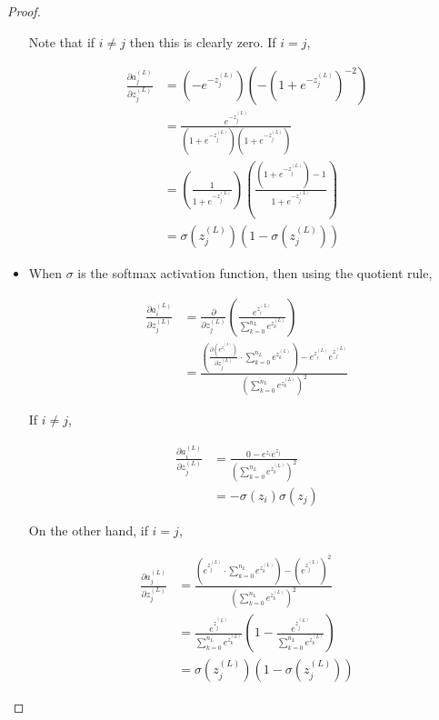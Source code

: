 \documentclass{article}
\begin{document}
\begin{proof}
\begin{itemize}
                Note that if $i \neq j$ then this is clearly zero. If $i = j$,
                
                $$ \begin{aligned}
                \frac{\partial a^{(L)}_j}{\partial z^{(L)}_j}
                &= \left( - e^{-z^{(L)}_j} \right) \left( - \left( 1 + e^{-z^{(L)}_j} \right)^{-2} \right) \\
                &= \frac{e^{-z^{(L)}_j}}{\left( 1 + e^{-z^{(L)}_j} \right) \left( 1 + e^{-z^{(L)}_j} \right)} \\
                &= \left( \frac{1}{1 + e^{-z^{(L)}_j}} \right) \left( \frac{\left( 1 + e^{-z^{(L)}_j} \right) - 1}{1 + e^{-z^{(L)}_j}} \right) \\
                &= \sigma(z^{(L)}_j) \left( 1 - \sigma(z^{(L)}_j) \right)
                \end{aligned} $$
                
            
            
                \item When $\sigma$ is the softmax activation function, then using the quotient rule,
                
                $$ \begin{aligned}
                \frac{\partial a^{(L)}_i}{\partial z^{(L)}_j}
                &= \frac{\partial}{\partial z^{(L)}_j} \left( \frac{e^{z^{(L)}_i}}{\sum_{k=0}^{n_L} e^{z^{(L)}_k}} \right) \\
                &= \frac{\left( \frac{\partial \left( e^{z^{(L)}_i}\right)}{\partial z^{(L)}_j} \cdot \sum_{k=0}^{n_L} e^{z^{(L)}_k} \right) - e^{z^{(L)}_i} e^{z^{(L)}_j}}{\left( \sum_{k=0}^{n_L} e^{z^{(L)}_k} \right)^2}
                \end{aligned} $$
                
                
                If $i \neq j$,
               
                $$ \begin{aligned}
                \frac{\partial a^{(L)}_i}{\partial z^{(L)}_j}
                &= \frac{0 - e^{z_i} e^{z_j}}{\left( \sum_{k=0}^{n_L} e^{z^{(L)}_k} \right)^2} \\
                &= - \sigma(z_i) \sigma(z_j)
                \end{aligned} $$
                
                On the other hand, if $i = j$,
                
                $$ \begin{aligned}
                \frac{\partial a^{(L)}_j}{\partial z^{(L)}_j}
                &= \frac{\left( e^{z^{(L)}_j} \cdot \sum_{k=0}^{n_L} e^{z^{(L)}_k} \right) - \left( e^{z^{(L)}_j} \right)^2}{\left( \sum_{k=0}^{n_L} e^{z^{(L)}_k} \right)^2} \\
                &= \frac{e^{z^{(L)}_j}}{\sum_{k=0}^{n_L} e^{z^{(L)}_k}} \left( 1 - \frac{e^{z^{(L)}_j}}{\sum_{k=0}^{n_L} e^{z^{(L)}_k}} \right) \\
                &= \sigma(z^{(L)}_j) \left( 1 - \sigma(z^{(L)}_j) \right)
                \end{aligned} $$
                

\end{itemize}
\end{proof}
\end{document}
